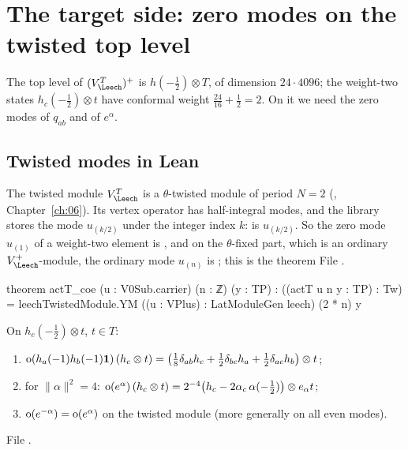 \section{The target side: zero modes on the twisted top level}\label{ch13:sec:target}

The top level of $(V_\Leech^T)^+$ is $h(-\tfrac12)\otimes T$, of dimension $24\cdot4096$; the weight-two
states $h_c(-\tfrac12)\otimes t$ have conformal weight $\tfrac{24}{16}+\tfrac12=2$. On it we need the zero
modes of $q_{ab}$ and of $e^\alpha$.

\subsection{Twisted modes in Lean}
The twisted module $V_\Leech^T$ is a $\theta$-twisted module of period $N=2$
(, Chapter~\ref{ch:06}). Its vertex operator has half-integral
modes, and the library stores the mode $u_{(k/2)}$ under the integer index $k$:
 is $u_{(k/2)}$. So the zero mode $u_{(1)}$ of a weight-two element is , and
on the $\theta$-fixed part, which is an ordinary $V_\Leech^+$-module, the ordinary mode $u_{(n)}$ is
; this is the theorem
\noindent File .
\begin{leancode}
theorem actT_coe (u : V0Sub.carrier) (n : ℤ) (y : TP) :
    ((actT u n y : TP) : Tw) = leechTwistedModule.YM ((u : VPlus) : LatModuleGen leech) (2 * n) y
\end{leancode}
\begin{proposition}\label{ch13:prop:target-modes}
On $h_c(-\tfrac12)\otimes t$, $t\in T$:
\begin{enumerate}[label=(\alph*)]
\item $\operatorname{o}(h_a(-1)h_b(-1)\mathbf 1)\,(h_c\otimes t)=\bigl(\tfrac18\delta_{ab}h_c+\tfrac12\delta_{bc}h_a+\tfrac12\delta_{ac}h_b\bigr)\otimes t$;
\item for $\|\alpha\|^2=4$: $\operatorname{o}(e^\alpha)\,(h_c\otimes t)=2^{-4}\bigl(h_c-2\alpha_c\,\alpha(-\tfrac12)\bigr)\otimes e_\alpha t$;
\item $\operatorname{o}(e^{-\alpha})=\operatorname{o}(e^{\alpha})$ on the twisted module (more generally on all even modes).
\end{enumerate}
\end{proposition}
\noindent File .
